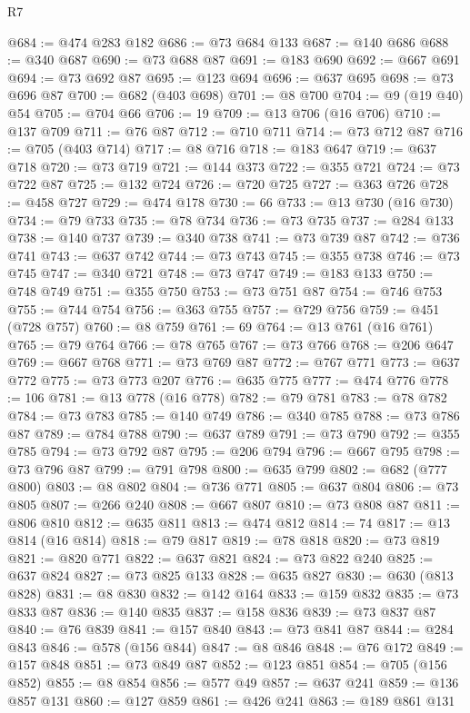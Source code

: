 \begin{lexlean}{R7}
\begin{coremodule}
@684 := @474 @283 @182
@686 := @73 @684 @133
@687 := @140 @686
@688 := @340 @687
@690 := @73 @688 @87
@691 := @183 @690
@692 := @667 @691
@694 := @73 @692 @87
@695 := @123 @694
@696 := @637 @695
@698 := @73 @696 @87
@700 := @682 (@403 @698)
@701 := @8 @700
@704 := @9 (@19 @40) @54
@705 := @704 @66
@706 := 19
@709 := @13 @706 (@16 @706)
@710 := @137 @709
@711 := @76 @87
@712 := @710 @711
@714 := @73 @712 @87
@716 := @705 (@403 @714)
@717 := @8 @716
@718 := @183 @647
@719 := @637 @718
@720 := @73 @719
@721 := @144 @373
@722 := @355 @721
@724 := @73 @722 @87
@725 := @132 @724
@726 := @720 @725
@727 := @363 @726
@728 := @458 @727
@729 := @474 @178
@730 := 66
@733 := @13 @730 (@16 @730)
@734 := @79 @733
@735 := @78 @734
@736 := @73 @735
@737 := @284 @133
@738 := @140 @737
@739 := @340 @738
@741 := @73 @739 @87
@742 := @736 @741
@743 := @637 @742
@744 := @73 @743
@745 := @355 @738
@746 := @73 @745
@747 := @340 @721
@748 := @73 @747
@749 := @183 @133
@750 := @748 @749
@751 := @355 @750
@753 := @73 @751 @87
@754 := @746 @753
@755 := @744 @754
@756 := @363 @755
@757 := @729 @756
@759 := @451 (@728 @757)
@760 := @8 @759
@761 := 69
@764 := @13 @761 (@16 @761)
@765 := @79 @764
@766 := @78 @765
@767 := @73 @766
@768 := @206 @647
@769 := @667 @768
@771 := @73 @769 @87
@772 := @767 @771
@773 := @637 @772
@775 := @73 @773 @207
@776 := @635 @775
@777 := @474 @776
@778 := 106
@781 := @13 @778 (@16 @778)
@782 := @79 @781
@783 := @78 @782
@784 := @73 @783
@785 := @140 @749
@786 := @340 @785
@788 := @73 @786 @87
@789 := @784 @788
@790 := @637 @789
@791 := @73 @790
@792 := @355 @785
@794 := @73 @792 @87
@795 := @206 @794
@796 := @667 @795
@798 := @73 @796 @87
@799 := @791 @798
@800 := @635 @799
@802 := @682 (@777 @800)
@803 := @8 @802
@804 := @736 @771
@805 := @637 @804
@806 := @73 @805
@807 := @266 @240
@808 := @667 @807
@810 := @73 @808 @87
@811 := @806 @810
@812 := @635 @811
@813 := @474 @812
@814 := 74
@817 := @13 @814 (@16 @814)
@818 := @79 @817
@819 := @78 @818
@820 := @73 @819
@821 := @820 @771
@822 := @637 @821
@824 := @73 @822 @240
@825 := @637 @824
@827 := @73 @825 @133
@828 := @635 @827
@830 := @630 (@813 @828)
@831 := @8 @830
@832 := @142 @164
@833 := @159 @832
@835 := @73 @833 @87
@836 := @140 @835
@837 := @158 @836
@839 := @73 @837 @87
@840 := @76 @839
@841 := @157 @840
@843 := @73 @841 @87
@844 := @284 @843
@846 := @578 (@156 @844)
@847 := @8 @846
@848 := @76 @172
@849 := @157 @848
@851 := @73 @849 @87
@852 := @123 @851
@854 := @705 (@156 @852)
@855 := @8 @854
@856 := @577 @49
@857 := @637 @241
@859 := @136 @857 @131
@860 := @127 @859
@861 := @426 @241
@863 := @189 @861 @131

\end{coremodule}
\end{lexlean}
